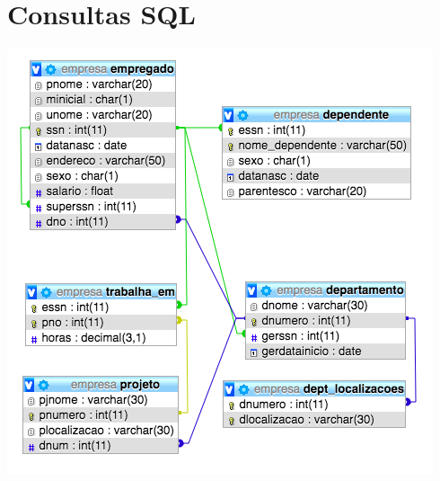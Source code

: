 \documentclass[11pt]{article}
\begin{document}
	\newpage
	\section{Consultas SQL}
	
	\centering
	\includegraphics[scale=0.5]{empresa}
	
\end{document}
